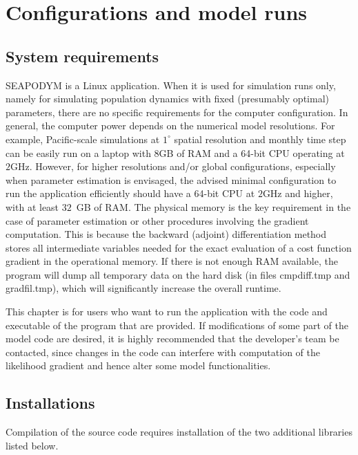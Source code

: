 \chapter{Configurations and model runs}\label{ch:configurations}

\section{System requirements}
\label{sec:getting-started}

SEAPODYM is a Linux application. When it is used for simulation runs only, namely for simulating population dynamics with fixed (presumably optimal) parameters, there are no specific requirements for the computer configuration. In general, the computer power depends on the numerical model resolutions. For example, Pacific-scale simulations at $1^{\circ}$ spatial resolution and monthly time step can be easily run on a laptop with 8GB of RAM and a 64-bit CPU operating at $2\textrm{GHz}$. However, for higher resolutions and/or global configurations, especially when parameter estimation is envisaged, the advised minimal configuration to run the application efficiently should have a 64-bit CPU at $2\textrm{GHz}$ and higher, with at least $32$~GB of RAM. The physical memory is the key requirement in the case of parameter estimation or other procedures involving the gradient computation. This is because the backward (adjoint) differentiation method stores all intermediate variables needed for the exact evaluation of a cost function gradient in the operational memory. If there is not enough RAM available, the program will dump all temporary data on the hard disk (in files cmpdiff.tmp and gradfil.tmp), which will significantly increase the overall runtime. 

This chapter is for users who want to run the application with the code and executable of the program that are provided. If modifications of some part of the model code are desired, it is highly recommended that the developer's team be contacted, since changes in the code can interfere with computation of the likelihood gradient and hence alter some model functionalities. 

\section{Installations}
\label{sec:installations}

Compilation of the source code requires installation of the two additional libraries listed below.


